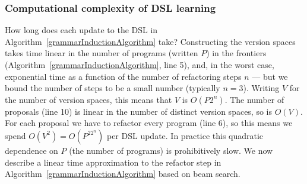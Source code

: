 \documentclass{article}
\begin{document}
\subsubsection{Computational complexity of DSL learning}

How long does each update to the DSL in
Algorithm~\ref{grammarInductionAlgorithm} take?  Constructing the
version spaces takes time linear in the number of programs (written
$P$) in the frontiers (Algorithm~\ref{grammarInductionAlgorithm}, line
5), and, in the worst case, exponential time as a function of the
number of refactoring steps $n$ --- but we bound the number of steps
to be a small number (typically $n = 3$).  Writing $V$ for the number
of version spaces, this means that $V$ is $O(P2^n)$.  The number of
proposals (line 10) is linear in the number of distinct version
spaces, so is $O(V)$.  For each proposal we have to refactor every
program (line 6), so this means we spend $O(V^2) = O(P^22^n)$ per DSL
update.  In practice this quadratic dependence on $P$ (the number of
programs) is prohibitively slow.  We now describe a linear time
approximation to the refactor step in
Algorithm~\ref{grammarInductionAlgorithm} based on beam search.
\end{document}
